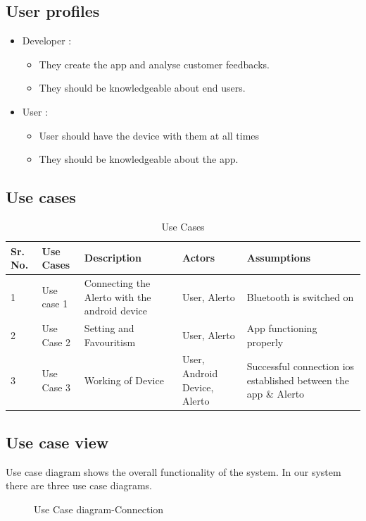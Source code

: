 \documentclass[12pt,a4paper]{report}
\begin{document}
\subsection{User profiles}
\begin{itemize}
	\item Developer :
	\begin{itemize}
		\item They create the app and analyse customer feedbacks.
		\item They should be knowledgeable about end users.
	\end{itemize}
	
	\item User :
	\begin{itemize}
		\item User should have the device with them at all times
		\item They should be knowledgeable about the app.
	\end{itemize}
\end{itemize}

\subsection{Use cases}
\begin{table}[!h]
	\centering
	\begin{tabular} { |p{0.5cm}|p{2cm}|p{3.5cm}|p{3cm}|p{4.5cm}| }
		\hline
		Sr. No. & Use Cases & Description & Actors & Assumptions \\ \hline
		1 & Use case 1 & Connecting the Alerto with the android device & User, Alerto & Bluetooth is switched on\\ \hline
		2 & Use Case 2 & Setting and Favouritism & User, Alerto & App functioning properly \\ \hline
		3 & Use Case 3 & Working of Device & User, Android Device, Alerto & Successful connection ios established between the app \& Alerto \\ \hline
	\end{tabular}
	\caption{Use Cases}
\end{table}
\newpage
\subsection{Use case view}
Use case diagram shows the overall functionality of the system. In our system there are three use case diagrams.\\
\begin{figure}[!h]
	\begin{center}
		\caption{Use Case diagram-Connection}
	\end{center}
\end{figure}
\end{document}
